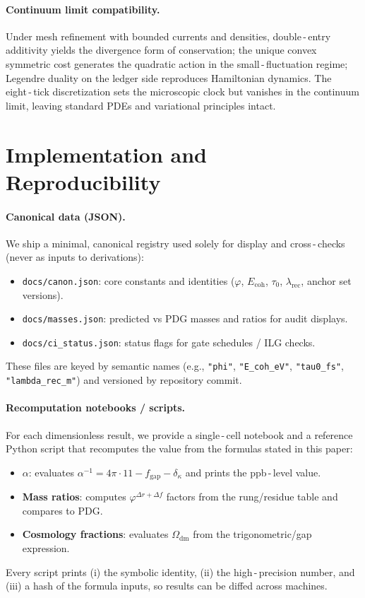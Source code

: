 \documentclass[11pt]{article}
\newcommand{\ph}{\varphi}
\newcommand{\lamrec}{\lambda_{\mathrm{rec}}}
\newcommand{\tauzero}{\tau_{0}}
\newcommand{\Ecoh}{E_{\mathrm{coh}}}
\theoremstyle{remark}
\begin{document}
\paragraph{Continuum limit compatibility.}
Under mesh refinement with bounded currents and densities, double\,\mbox{-}\,entry additivity yields the divergence form of conservation; the unique convex symmetric cost generates the quadratic action in the small\,\mbox{-}\,fluctuation regime; Legendre duality on the ledger side reproduces Hamiltonian dynamics. The eight\,\mbox{-}\,tick discretization sets the microscopic clock but vanishes in the continuum limit, leaving standard PDEs and variational principles intact.

\section{Implementation and Reproducibility}
\paragraph{Canonical data (JSON).}
We ship a minimal, canonical registry used solely for display and cross\,\mbox{-}\,checks (never as inputs to derivations):
\begin{itemize}
  \item \texttt{docs/canon.json}: core constants and identities ($\ph$, $\Ecoh$, $\tauzero$, $\lamrec$, anchor set versions).
  \item \texttt{docs/masses.json}: predicted vs PDG masses and ratios for audit displays.
  \item \texttt{docs/ci\_status.json}: status flags for gate schedules / ILG checks.
\end{itemize}
These files are keyed by semantic names (e.g., \texttt{"phi"}, \texttt{"E\_coh\_eV"}, \texttt{"tau0\_fs"}, \texttt{"lambda\_rec\_m"}) and versioned by repository commit.

\paragraph{Recomputation notebooks / scripts.}
For each dimensionless result, we provide a single\,\mbox{-}\,cell notebook and a reference Python script that recomputes the value from the formulas stated in this paper:
\begin{itemize}
  \item \textbf{$\alpha$}: evaluates $\alpha^{-1}=4\pi\cdot 11 - f_{\mathrm{gap}} - \delta_{\kappa}$ and prints the ppb\,\mbox{-}\,level value.
  \item \textbf{Mass ratios}: computes $\varphi^{\Delta r + \Delta f}$ factors from the rung/residue table and compares to PDG.
  \item \textbf{Cosmology fractions}: evaluates $\Omega_{\mathrm{dm}}$ from the trigonometric/gap expression.
\end{itemize}
Every script prints (i) the symbolic identity, (ii) the high\,\mbox{-}\,precision number, and (iii) a hash of the formula inputs, so results can be diffed across machines.
\end{document}
